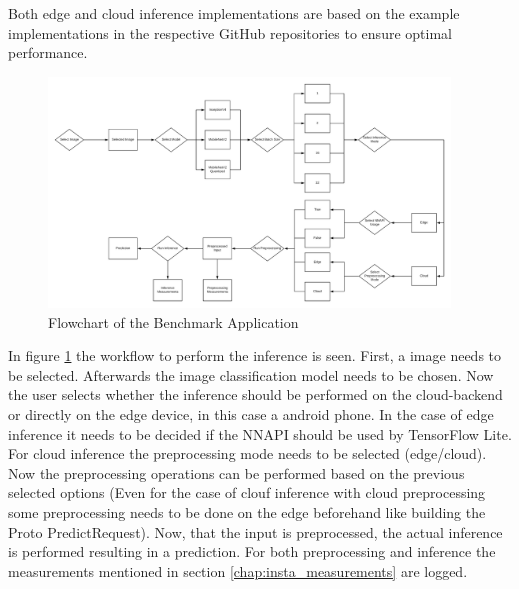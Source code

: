 Both edge and cloud inference implementations are based on the example implementations in the respective GitHub repositories to ensure optimal performance. 

\begin{figure}[H]
\centering
\includegraphics[width=0.95\textwidth]{./Bilder/FlowChart_App.png}
\caption{Flowchart of the Benchmark Application}
\label{fig:app}
\end{figure}
In figure \ref{fig:app} the workflow to perform the inference is seen. First, a image needs to be selected. Afterwards the image classification model needs to be chosen. Now the user selects whether the inference should be performed on the cloud-backend or directly on the edge device, in this case a android phone. In the case of edge inference it needs to be decided if the NNAPI should be used by TensorFlow Lite. For cloud inference the preprocessing mode needs to be selected (edge/cloud). Now the preprocessing operations can be performed based on the previous selected options (Even for the case of clouf inference with cloud preprocessing some preprocessing needs to be done on the edge beforehand like building the Proto PredictRequest). Now, that the input is preprocessed, the actual inference is performed resulting in a prediction. For both preprocessing and inference the measurements mentioned in section \ref{chap:insta_measurements} are logged.

